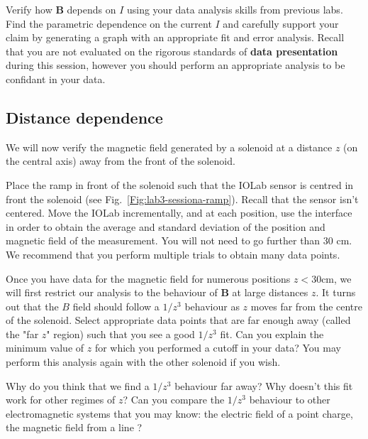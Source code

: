 \documentclass[12pt]{report}
\begin{document}
{\color{blue}Verify how $\mathbf{B}$ depends on $I$ using your data analysis skills from previous labs. Find the parametric dependence on the current $I$ and carefully support your claim by generating a graph with an appropriate fit and error analysis.
Recall that you are not evaluated on the rigorous standards of \textbf{data presentation} during this session, however you should perform an appropriate analysis to be confidant in your data. }

\subsection{Distance dependence}
We will now verify the magnetic field generated by a solenoid at a distance $z$ (on the central axis) away from the front of the solenoid.

Place the ramp in front of the solenoid such that the IOLab sensor is centred in front the solenoid (see Fig.~\ref{Fig:lab3-sessiona-ramp}). 
Recall that the sensor isn't centered. Move the IOLab incrementally, and {\color{blue}at each position, use the interface in order to obtain the average and standard deviation of the position and magnetic field of the measurement. }
You will not need to go further than 30 cm. We recommend that you perform multiple trials to obtain many data points.

Once you have data for the magnetic field for numerous positions $z<30$cm, we will first restrict our analysis to the behaviour of $\mathbf{B}$ at large distances $z$. It turns out that the $B$ field should follow a $1/z^3$ behaviour as $z$ moves far from the centre of the solenoid. 
{\color{blue}Select appropriate data points that are far enough away (called the "far $z$" region) such that you see a good $1/z^3$ fit. Can you explain the minimum value of $z$ for which you performed a cutoff in your data?} You may perform this analysis again with the other solenoid if you wish.




{\color{blue} Why do you think that we find a $1/z^3$ behaviour far away?
Why doesn't this fit work for other regimes of $z$?
Can you compare the $1/z^3$ behaviour to other electromagnetic systems that you may know: the electric field of a point charge, the magnetic field from a line
?}
\end{document}
